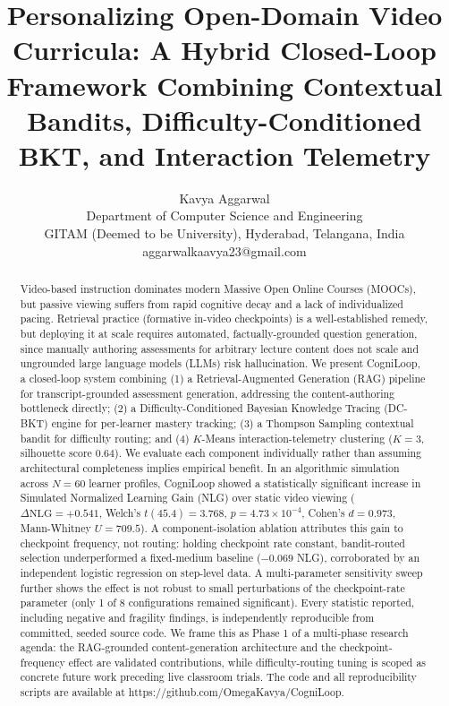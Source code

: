 \documentclass[notitlepage,12pt]{jedm}
\begin{document}
\title{Personalizing Open-Domain Video Curricula: A Hybrid Closed-Loop Framework Combining Contextual Bandits, Difficulty-Conditioned BKT, and Interaction Telemetry}
\date{}

\author{{\large Kavya Aggarwal}\\Department of Computer Science and Engineering\\GITAM (Deemed to be University), Hyderabad, Telangana, India\\aggarwalkaavya23@gmail.com}

\maketitle

\begin{abstract}
Video-based instruction dominates modern Massive Open Online Courses (MOOCs), but passive viewing suffers from rapid cognitive decay and a lack of individualized pacing. Retrieval practice (formative in-video checkpoints) is a well-established remedy, but deploying it at scale requires automated, factually-grounded question generation, since manually authoring assessments for arbitrary lecture content does not scale and ungrounded large language models (LLMs) risk hallucination. We present CogniLoop, a closed-loop system combining (1) a Retrieval-Augmented Generation (RAG) pipeline for transcript-grounded assessment generation, addressing the content-authoring bottleneck directly; (2) a Difficulty-Conditioned Bayesian Knowledge Tracing (DC-BKT) engine for per-learner mastery tracking; (3) a Thompson Sampling contextual bandit for difficulty routing; and (4) $K$-Means interaction-telemetry clustering ($K=3$, silhouette score $0.64$). We evaluate each component individually rather than assuming architectural completeness implies empirical benefit. In an algorithmic simulation across $N=60$ learner profiles, CogniLoop showed a statistically significant increase in Simulated Normalized Learning Gain (NLG) over static video viewing ($\Delta\text{NLG}=+0.541$, Welch's $t(45.4)=3.768$, $p=4.73\times10^{-4}$, Cohen's $d=0.973$, Mann-Whitney $U=709.5$). A component-isolation ablation attributes this gain to checkpoint frequency, not routing: holding checkpoint rate constant, bandit-routed selection underperformed a fixed-medium baseline ($-0.069$ NLG), corroborated by an independent logistic regression on step-level data. A multi-parameter sensitivity sweep further shows the effect is not robust to small perturbations of the checkpoint-rate parameter (only 1 of 8 configurations remained significant). Every statistic reported, including negative and fragility findings, is independently reproducible from committed, seeded source code. We frame this as Phase 1 of a multi-phase research agenda: the RAG-grounded content-generation architecture and the checkpoint-frequency effect are validated contributions, while difficulty-routing tuning is scoped as concrete future work preceding live classroom trials. The code and all reproducibility scripts are available at https://github.com/OmegaKavya/CogniLoop.\\


\end{abstract}
\end{document}
